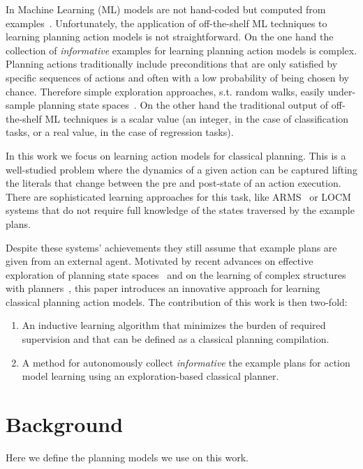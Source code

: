 \documentclass[letterpaper]{article} %
\begin{document}
In Machine Learning (ML) models are not hand-coded but computed from examples~\cite{michalski2013machine}. Unfortunately, the application of off-the-shelf ML techniques to learning planning action models is not straightforward. On the one hand the collection of {\em informative} examples for learning planning action models is complex. Planning actions traditionally include preconditions that are only satisfied by specific sequences of actions and often with a low probability of being chosen by chance. Therefore simple exploration approaches, s.t. random walks, easily under-sample planning state spaces~\cite{fern2004learning}. On the other hand the traditional output of off-the-shelf ML techniques is a scalar value (an integer, in the case of classification tasks, or a real value, in the case of regression tasks).

In this work we focus on learning action models for classical planning. This is a well-studied problem where the dynamics of a given action can be captured lifting the literals that change between the pre and post-state of an action execution. There are sophisticated learning approaches for this task, like ARMS~\cite{yang2007learning} or LOCM~\cite{cresswell2013acquiring} systems that do not require full knowledge of the states traversed by the example plans.

Despite these systems' achievements they still assume that example plans are given from an external agent. Motivated by recent advances on effective exploration of planning state spaces~\cite{} and on the learning of complex structures with planners~\cite{segovia2017unsupervised}, this paper introduces an innovative approach for learning classical planning action models. The contribution of this work is then two-fold:
\begin{enumerate}
\item An inductive learning algorithm that minimizes the burden of required supervision and that can be defined as a classical planning compilation. 
\item A method for autonomously collect {\em informative} the example plans for action model learning using an exploration-based classical planner.
\end{enumerate}


\section{Background}
Here we define the planning models we use on this work.
\end{document}
